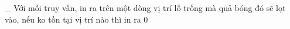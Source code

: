 \_ Với mỗi truy vấn, in ra trên một dòng vị trí lỗ trống mà quả bóng đó sẽ lọt vào, nếu ko tồn tại vị trí nào thì in ra 0  

\